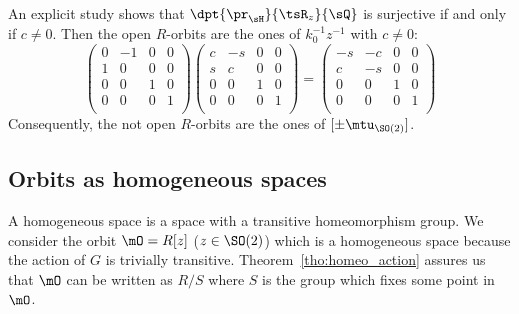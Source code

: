 An explicit study shows that $\dpt{\pr_{\sH}}{\tsR_z}{\sQ}$ is surjective if and only if $c\neq 0$. Then the open $R$-orbits are the ones of $k_0^{-1} z^{-1}$ with $c\neq 0$:
\begin{equation}
	\begin{pmatrix}
		0 & -1 & 0 & 0 \\
		1 & 0  & 0 & 0 \\
		0 & 0  & 1 & 0 \\
		0 & 0  & 0 & 1 \\
	\end{pmatrix}
	\begin{pmatrix}
		c & -s & 0 & 0 \\
		s & c  & 0 & 0 \\
		0 & 0  & 1 & 0 \\
		0 & 0  & 0 & 1 \\
	\end{pmatrix}
	=
	\begin{pmatrix}
		-s & -c & 0 & 0 \\
		c  & -s & 0 & 0 \\
		0  & 0  & 1 & 0 \\
		0  & 0  & 0 & 1 \\
	\end{pmatrix}
\end{equation}
Consequently, the not open $R$-orbits are the ones of $[\pm\mtu_{\SO(2)}]$.

\subsection{Orbits as homogeneous spaces}
A homogeneous space is a space with a transitive homeomorphism group. We consider the orbit $\mO=R[z]$ ($z\in \SO(2)$) which is a homogeneous space because the action of $G$ is trivially transitive. Theorem~\ref{tho:homeo_action} assures us that $\mO$ can be written as $R/S$ where $S$ is the group which fixes some point in $\mO$.

